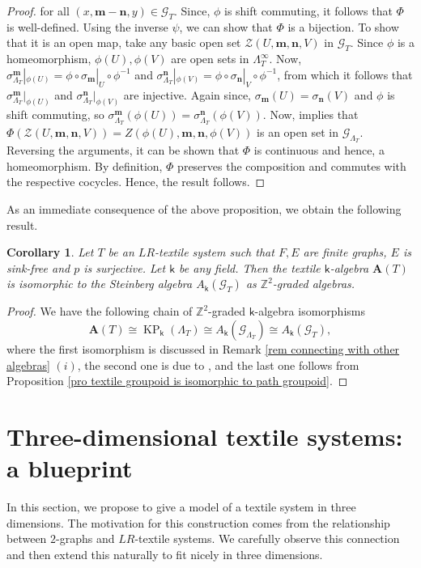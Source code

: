 \documentclass[a4paper,reqno,12pt]{amsart}
\newcommand{\Zz}{\mathcal{Z}}
\newcommand{\N}{\mathbf{n}}
\newcommand{\M}{\mathbf{m}}
\newcommand{\KP}{\operatorname{KP}}
\newtheorem{cor}[thm]{Corollary}
\theoremstyle{definition}
\theoremstyle{remark}
\begin{document}
\begin{proof}
for all $(x,\M-\N,y)\in \mathcal{G}_T$. Since, $\phi$ is shift commuting, it follows that $\Phi$ is well-defined. Using the inverse $\psi$, we can show that $\Phi$ is a bijection. To show that it is an open map, take any basic open set $\Zz(U,\M,\N,V)$ in $\mathcal{G}_T$. Since $\phi$ is a homeomorphism, $\phi(U),\phi(V)$ are open sets in $\Lambda_T^\infty$. Now, $\sigma_{\Lambda_T}^\M|_{\phi(U)}=\phi\circ \sigma_\M|_U\circ \phi^{-1}$ and $\sigma_{\Lambda_T}^\N|_{\phi(V)}=\phi\circ \sigma_\N|_V\circ \phi^{-1}$, from which it follows that $\sigma_{\Lambda_T}^\M|_{\phi(U)}$ and $\sigma_{\Lambda_T}^\N|_{\phi(V)}$ are injective. Again since, $\sigma_\M(U)=\sigma_\N(V)$ and $\phi$ is shift commuting, so $\sigma_{\Lambda_T}^\M(\phi(U))=\sigma_{\Lambda_T}^\N(\phi(V))$. Now, \cite[Lemma 2.4]{Rout} implies that $\Phi(\Zz(U,\M,\N,V))=Z(\phi(U),\M,\N,\phi(V))$ is an open set in $\mathcal{G}_{\Lambda_T}$. Reversing the arguments, it can be shown that $\Phi$ is continuous and hence, a homeomorphism. By definition, $\Phi$ preserves the composition and commutes with the respective cocycles. Hence, the result follows.
\end{proof}
As an immediate consequence of the above proposition, we obtain the following result.
\begin{cor}\label{cor textile algebra as Steinberg algebra}
Let $T$ be an $LR$-textile system such that $F,E$ are finite graphs, $E$ is sink-free and $p$ is surjective. Let $\mathsf{k}$ be any field. Then the textile $\mathsf{k}$-algebra $\mathbf{A}(T)$ is isomorphic to the Steinberg algebra $A_\mathsf{k}(\mathcal{G}_T)$ as $\mathbb{Z}^2$-graded algebras.
\end{cor}
\begin{proof}
We have the following chain of $\mathbb{Z}^2$-graded $\mathsf{k}$-algebra isomorphisms \[\mathbf{A}(T)\cong \KP_\mathsf{k}(\Lambda_T)\cong A_\mathsf{k}(\mathcal{G}_{\Lambda_T})\cong A_\mathsf{k}(\mathcal{G}_T),\] where the first isomorphism is discussed in Remark \ref{rem connecting with other algebras} $(i)$, the second one is due to \cite[Proposition 5.4]{Clark}, and the last one follows from Proposition \ref{pro textile groupoid is isomorphic to path groupoid}. 
\end{proof}
\section{Three-dimensional textile systems: a blueprint}\label{sec 3D textiles}
In this section, we propose to give a model of a textile system in three dimensions. The motivation for this construction comes from the relationship between $2$-graphs and $LR$-textile systems. We carefully observe this connection and then extend this naturally to fit nicely in three dimensions. 
\end{document}
